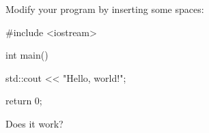 Modify your program by inserting some spaces:
\begin{console}
#include <iostream>

int main()
{
    std::cout            << "Hello, world!\n";

    return 0;
}
\end{console}
Does it work?
